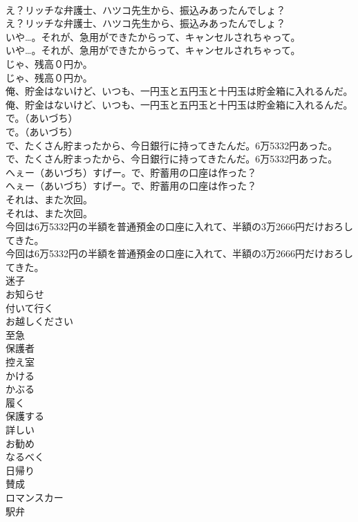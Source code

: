 \documentclass[8pt]{extreport}
\begin{document}
\begin{CJK}{UTF8}{min}
\\	え？リッチな弁護士、ハツコ先生から、振込みあったんでしょ？	
\\	え？リッチな弁護士、ハツコ先生から、振込みあったんでしょ？ 
\\	いや…。それが、急用ができたからって、キャンセルされちゃって。	
\\	いや…。それが、急用ができたからって、キャンセルされちゃって。 
\\	じゃ、残高０円か。	
\\	じゃ、残高０円か。 
\\	俺、貯金はないけど、いつも、一円玉と五円玉と十円玉は貯金箱に入れるんだ。	
\\	俺、貯金はないけど、いつも、一円玉と五円玉と十円玉は貯金箱に入れるんだ。 
\\	で。（あいづち）	
\\	で。（あいづち） 
\\	で、たくさん貯まったから、今日銀行に持ってきたんだ。6万5332円あった。	
\\	で、たくさん貯まったから、今日銀行に持ってきたんだ。6万5332円あった。 
\\	へぇー（あいづち）すげー。で、貯蓄用の口座は作った？	
\\	へぇー（あいづち）すげー。で、貯蓄用の口座は作った？ 
\\	それは、また次回。	
\\	それは、また次回。 
\\	今回は6万5332円の半額を普通預金の口座に入れて、半額の3万2666円だけおろしてきた。	
\\	今回は6万5332円の半額を普通預金の口座に入れて、半額の3万2666円だけおろしてきた。 
\\	迷子
\\	お知らせ
\\	付いて行く
\\	お越しください
\\	至急
\\	保護者
\\	控え室
\\	かける
\\	かぶる
\\	履く
\\	保護する
\\	詳しい
\\	お勧め
\\	なるべく
\\	日帰り
\\	賛成
\\	ロマンスカー
\\	駅弁

\end{CJK}
\end{document}
